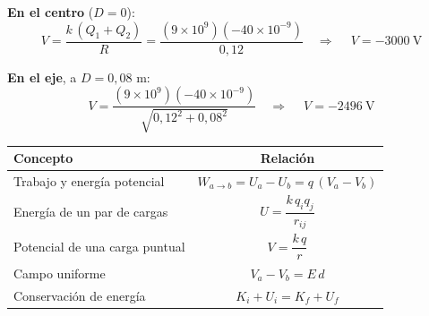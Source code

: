 \documentclass[12pt,letterpaper]{article}
\newcommand{\secgap}{\vspace{0.55cm}}
\begin{document}
\smallskip
\noindent\textbf{En el centro} ($D=0$):
\[
    V=\frac{k\,(Q_1+Q_2)}{R}=\frac{(9\times10^{9})(-40\times10^{-9})}{0{,}12}
    \quad\Longrightarrow\quad
    \boxed{\ V=-3000\ \text{V}\ }
\]

\smallskip
\noindent\textbf{En el eje}, a $D=0{,}08$ m:
\[
    V=\frac{(9\times10^{9})(-40\times10^{-9})}{\sqrt{0{,}12^{2}+0{,}08^{2}}}
    \quad\Longrightarrow\quad
    \boxed{\ V=-2496\ \text{V}\ }
\]

\secgap

\begin{center}
\renewcommand{\arraystretch}{1.6}
\begin{tabular}{|l|c|}
\hline
\textbf{Concepto} & \textbf{Relaci\'on} \\ \hline
Trabajo y energ\'ia potencial & $W_{a\to b}=U_a-U_b=q\,(V_a-V_b)$ \\ \hline
Energ\'ia de un par de cargas & $U=\dfrac{k\,q_i q_j}{r_{ij}}$ \\ \hline
Potencial de una carga puntual & $V=\dfrac{k\,q}{r}$ \\ \hline
Campo uniforme & $V_a-V_b=E\,d$ \\ \hline
Conservaci\'on de energ\'ia & $K_i+U_i=K_f+U_f$ \\ \hline
\end{tabular}
\end{center}
\end{document}
